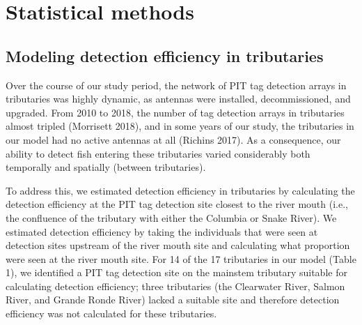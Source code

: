 \documentclass[
  12pt,
]{report}
\begin{document}
\hypertarget{statistical-methods}{%
\section{Statistical methods}\label{statistical-methods}}

\hypertarget{modeling-detection-efficiency-in-tributaries}{%
\subsection{Modeling detection efficiency in
tributaries}\label{modeling-detection-efficiency-in-tributaries}}

Over the course of our study period, the network of PIT tag detection
arrays in tributaries was highly dynamic, as antennas were installed,
decommissioned, and upgraded. From 2010 to 2018, the number of tag
detection arrays in tributaries almost tripled (Morrisett 2018), and in
some years of our study, the tributaries in our model had no active
antennas at all (Richins 2017). As a consequence, our ability to detect
fish entering these tributaries varied considerably both temporally and
spatially (between tributaries).

To address this, we estimated detection efficiency in tributaries by
calculating the detection efficiency at the PIT tag detection site
closest to the river mouth (i.e., the confluence of the tributary with
either the Columbia or Snake River). We estimated detection efficiency
by taking the individuals that were seen at detection sites upstream of
the river mouth site and calculating what proportion were seen at the
river mouth site. For 14 of the 17 tributaries in our model (Table 1),
we identified a PIT tag detection site on the mainstem tributary
suitable for calculating detection efficiency; three tributaries (the
Clearwater River, Salmon River, and Grande Ronde River) lacked a
suitable site and therefore detection efficiency was not calculated for
these tributaries.
\end{document}
